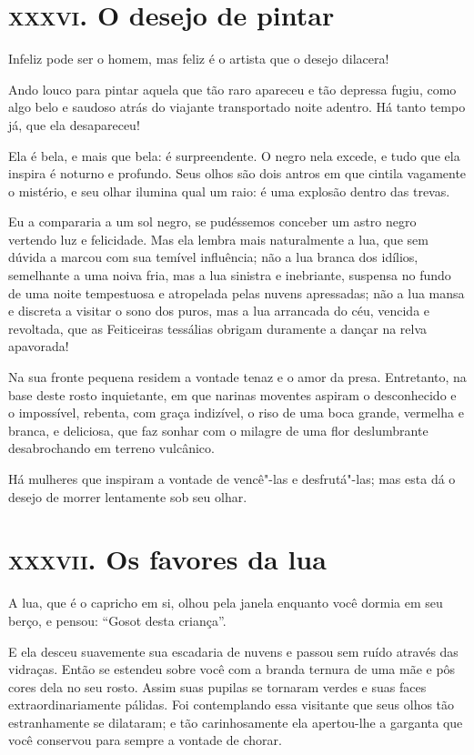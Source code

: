 \chapter{\textsc{xxxvi.} O desejo de pintar}

Infeliz pode ser o homem, mas feliz é o artista que o desejo dilacera!

Ando louco para pintar aquela que tão raro apareceu e tão
depressa fugiu, como algo belo e saudoso atrás do viajante transportado
noite adentro. Há tanto tempo já, que ela desapareceu!

Ela é bela, e mais que bela: é surpreendente. O negro nela excede, e
tudo que ela inspira é noturno e profundo. Seus olhos são dois antros
em que cintila vagamente o mistério, e seu olhar ilumina qual um raio: é
uma explosão dentro das trevas.

Eu a compararia a um sol negro, se pudéssemos conceber um astro negro
vertendo luz e felicidade. Mas ela lembra mais naturalmente a
lua, que sem dúvida a marcou com sua temível influência; não a lua
branca dos idílios, semelhante a uma noiva fria, mas a lua
sinistra e inebriante, suspensa no fundo de uma noite tempestuosa e
atropelada pelas nuvens apressadas; não a lua mansa e discreta a
visitar o sono dos puros, mas a lua arrancada do céu, vencida e
revoltada, que as Feiticeiras tessálias obrigam duramente a dançar
na relva apavorada!

Na sua fronte pequena residem a vontade tenaz e o amor da presa. Entretanto, na base deste rosto inquietante, em que narinas moventes aspiram
o desconhecido e o impossível, rebenta, com graça indizível, o riso de
uma boca grande, vermelha e branca, e deliciosa, que faz sonhar com o
milagre de uma flor deslumbrante desabrochando em terreno vulcânico.

Há mulheres que inspiram a vontade de vencê"-las e desfrutá"-las; mas
esta dá o desejo de morrer lentamente sob seu olhar.

\chapter{\textsc{xxxvii.} Os favores da lua}

A lua, que é o capricho em si, olhou pela janela enquanto você dormia
em seu berço, e pensou: “Gosot desta criança''.

E ela desceu suavemente sua escadaria de nuvens e passou sem ruído
através das vidraças. Então se estendeu sobre você com a branda ternura 
de uma mãe e pôs cores dela no seu rosto. Assim suas pupilas se
tornaram verdes e suas faces extraordinariamente pálidas. Foi
contemplando essa visitante que seus olhos tão estranhamente se
dilataram; e tão carinhosamente ela apertou-lhe a garganta que você
conservou para sempre a vontade de chorar.

